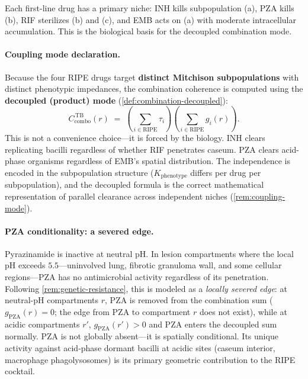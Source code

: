 \documentclass[11pt]{article}
\theoremstyle{plain}
\theoremstyle{definition}
\newcommand{\Kpheno}{K_{\mathrm{phenotype}}}
\newcommand{\Ccombo}{C_{\mathrm{combo}}}
\begin{document}
Each first-line drug has a primary niche: INH kills subpopulation
(a), PZA kills (b), RIF sterilizes (b) and (c), and EMB acts on
(a) with moderate intracellular accumulation. This is the biological
basis for the decoupled combination mode.

\paragraph{Coupling mode declaration.}
Because the four RIPE drugs target \textbf{distinct Mitchison
subpopulations} with distinct phenotypic impedances, the
combination coherence is computed using the \textbf{decoupled
(product) mode} (\cref{def:combination-decoupled}):
\begin{equation}
  \label{eq:c-combo-tb}
  \Ccombo^{\,\mathrm{TB}}(r) \;=\;
  \left(\sum_{i \in \mathrm{RIPE}} \tau_i\right)
  \left(\sum_{i \in \mathrm{RIPE}} g_i(r)\right).
\end{equation}
This is not a convenience choice---it is forced by the biology. INH
clears replicating bacilli regardless of whether RIF penetrates
caseum. PZA clears acid-phase organisms regardless of EMB's
spatial distribution. The independence is encoded in the
subpopulation structure ($\Kpheno$ differs per drug per
subpopulation), and the decoupled formula is the correct
mathematical representation of parallel clearance across
independent niches (\cref{rem:coupling-mode}).

\paragraph{PZA conditionality: a severed edge.}
Pyrazinamide is inactive at neutral pH. In lesion compartments
where the local pH exceeds $5.5$---uninvolved lung, fibrotic
granuloma wall, and some cellular regions---PZA has no antimicrobial
activity regardless of its penetration. Following \cref{rem:genetic-resistance},
this is modeled as a \emph{locally severed edge}: at neutral-pH
compartments $r$, PZA is removed from the combination sum
($g_{\mathrm{PZA}}(r) = 0$; the edge from PZA to compartment $r$
does not exist), while at acidic compartments $r'$,
$g_{\mathrm{PZA}}(r') > 0$ and PZA enters the decoupled sum
normally. PZA is not globally absent---it is spatially conditional.
Its unique activity against acid-phase dormant bacilli at acidic
sites (caseum interior, macrophage phagolysosomes) is its primary
geometric contribution to the RIPE cocktail.

\end{document}
